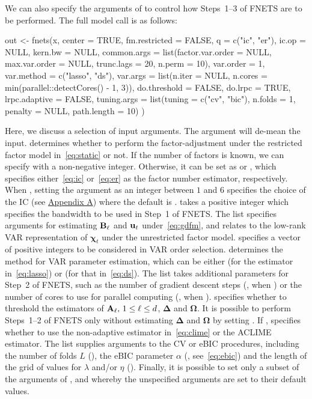 We can also specify the arguments of  to control how Steps~1--3 of FNETS are to be performed.
The full model call is as follows:
\begin{example}
out <- fnets(x, center = TRUE, fm.restricted = FALSE, 
  q = c("ic", "er"), ic.op = NULL, kern.bw = NULL,
  common.args = list(factor.var.order = NULL, max.var.order = NULL, trunc.lags = 20, 
  n.perm = 10), var.order = 1, var.method = c("lasso", "ds"),
  var.args = list(n.iter = NULL, n.cores = min(parallel::detectCores() - 1, 3)),
  do.threshold = FALSE, do.lrpc = TRUE, lrpc.adaptive = FALSE,
  tuning.args = list(tuning = c("cv", "bic"), n.folds = 1, penalty = NULL, 
  path.length = 10)
)
\end{example}
Here, we discuss a selection of input arguments.
The  argument will de-mean the input.
 determines whether to perform the factor-adjustment under the restricted factor model in~\eqref{eq:static} or not.
If the number of factors is known, we can specify  with a non-negative integer. 
Otherwise, it can be set as  or , which specifies either~\eqref{eq:ic} or~\eqref{eq:er} as the factor number estimator, respectively.
When , setting the argument  as an integer between $1$ and $6$ specifies the choice of the IC (see \hyperref[sec:factornumber]{Appendix A}) where the default is . 
 takes a positive integer which specifies the bandwidth to be used in Step~1 of FNETS.
The list  specifies arguments for estimating $\mathbf B_\ell$ and $\mathbf u_t$ under~\eqref{eq:gdfm}, and relates to the low-rank VAR representation of $\bm\chi_t$ under the unrestricted factor model.
 specifies a vector of positive integers to be considered in VAR order selection.
 determines the method for VAR parameter estimation, which can be either  (for the estimator in~\eqref{eq:lasso}) or  (for that in~\eqref{eq:ds}).
The list  takes additional parameters for Step~2 of FNETS, such as the number of gradient descent steps (, when ) or the number of cores to use for parallel computing (, when ).
 specifies whether to threshold the estimators of $\mathbf A_\ell, \, 1 \le \ell \le d$, $\bm\Delta$ and $\bm\Omega$.
It is possible to perform Steps~1--2 of FNETS only 
without estimating $\bm\Delta$ and $\bm\Omega$ by setting .
If ,  specifies whether to use the non-adaptive estimator in~\eqref{eq:clime} or the ACLIME estimator.
The list  supplies arguments to the CV or eBIC procedures, including the number of folds $L$ (), the eBIC parameter $\alpha$ (, see~\eqref{eq:ebic}) and the length of the grid of values for $\lambda$ and/or $\eta$ (). 
Finally, it is possible to set only a subset of the arguments of ,  and  whereby the unspecified arguments are set to their default values. 

